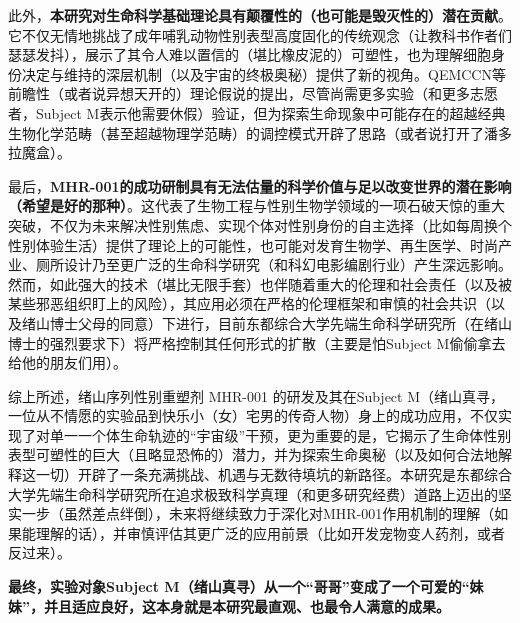 此外，\textbf{本研究对生命科学基础理论具有颠覆性的（也可能是毁灭性的）潜在贡献}。它不仅无情地挑战了成年哺乳动物性别表型高度固化的传统观念（让教科书作者们瑟瑟发抖），展示了其令人难以置信的（堪比橡皮泥的）可塑性，也为理解细胞身份决定与维持的深层机制（以及宇宙的终极奥秘）提供了新的视角。QEMCCN等前瞻性（或者说异想天开的）理论假说的提出，尽管尚需更多实验（和更多志愿者，Subject M表示他需要休假）验证，但为探索生命现象中可能存在的超越经典生物化学范畴（甚至超越物理学范畴）的调控模式开辟了思路（或者说打开了潘多拉魔盒）。

最后，\textbf{MHR-001的成功研制具有无法估量的科学价值与足以改变世界的潜在影响（希望是好的那种）}。这代表了生物工程与性别生物学领域的一项石破天惊的重大突破，不仅为未来解决性别焦虑、实现个体对性别身份的自主选择（比如每周换个性别体验生活）提供了理论上的可能性，也可能对发育生物学、再生医学、时尚产业、厕所设计乃至更广泛的生命科学研究（和科幻电影编剧行业）产生深远影响。然而，如此强大的技术（堪比无限手套）也伴随着重大的伦理和社会责任（以及被某些邪恶组织盯上的风险），其应用必须在严格的伦理框架和审慎的社会共识（以及绪山博士父母的同意）下进行，目前东都综合大学先端生命科学研究所（在绪山博士的强烈要求下）将严格控制其任何形式的扩散（主要是怕Subject M偷偷拿去给他的朋友们用）。

综上所述，绪山序列性别重塑剂 MHR-001 的研发及其在Subject M（绪山真寻，一位从不情愿的实验品到快乐小（女）宅男的传奇人物）身上的成功应用，不仅实现了对单一一个体生命轨迹的“宇宙级”干预，更为重要的是，它揭示了生命体性别表型可塑性的巨大（且略显恐怖的）潜力，并为探索生命奥秘（以及如何合法地解释这一切）开辟了一条充满挑战、机遇与无数待填坑的新路径。本研究是东都综合大学先端生命科学研究所在追求极致科学真理（和更多研究经费）道路上迈出的坚实一步（虽然差点绊倒），未来将继续致力于深化对MHR-001作用机制的理解（如果能理解的话），并审慎评估其更广泛的应用前景（比如开发宠物变人药剂，或者反过来）。

\textbf{最终，实验对象Subject M（绪山真寻）从一个“哥哥”变成了一个可爱的“妹妹”，并且适应良好，这本身就是本研究最直观、也最令人满意的成果。}